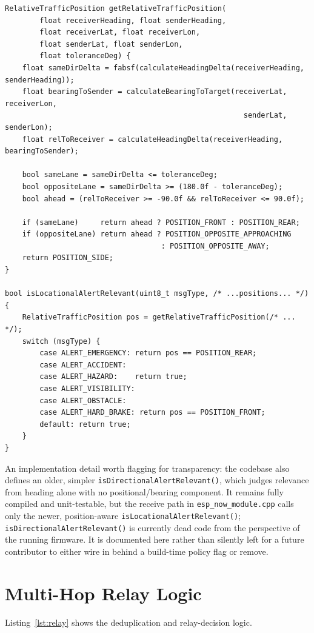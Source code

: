 \documentclass[12pt,a4paper]{report}
\begin{document}
\begin{lstlisting}[caption={Relative-position classification and relevance policy (\texttt{src/directional\_awareness.cpp}, trimmed)}, label={lst:relevance}]
RelativeTrafficPosition getRelativeTrafficPosition(
        float receiverHeading, float senderHeading,
        float receiverLat, float receiverLon,
        float senderLat, float senderLon,
        float toleranceDeg) {
    float sameDirDelta = fabsf(calculateHeadingDelta(receiverHeading, senderHeading));
    float bearingToSender = calculateBearingToTarget(receiverLat, receiverLon,
                                                       senderLat, senderLon);
    float relToReceiver = calculateHeadingDelta(receiverHeading, bearingToSender);

    bool sameLane = sameDirDelta <= toleranceDeg;
    bool oppositeLane = sameDirDelta >= (180.0f - toleranceDeg);
    bool ahead = (relToReceiver >= -90.0f && relToReceiver <= 90.0f);

    if (sameLane)     return ahead ? POSITION_FRONT : POSITION_REAR;
    if (oppositeLane) return ahead ? POSITION_OPPOSITE_APPROACHING
                                    : POSITION_OPPOSITE_AWAY;
    return POSITION_SIDE;
}

bool isLocationalAlertRelevant(uint8_t msgType, /* ...positions... */) {
    RelativeTrafficPosition pos = getRelativeTrafficPosition(/* ... */);
    switch (msgType) {
        case ALERT_EMERGENCY: return pos == POSITION_REAR;
        case ALERT_ACCIDENT:
        case ALERT_HAZARD:    return true;
        case ALERT_VISIBILITY:
        case ALERT_OBSTACLE:
        case ALERT_HARD_BRAKE: return pos == POSITION_FRONT;
        default: return true;
    }
}
\end{lstlisting}

An implementation detail worth flagging for transparency: the codebase also defines an older, simpler \texttt{isDirectionalAlertRelevant()}, which judges relevance from heading alone with no positional/bearing component. It remains fully compiled and unit-testable, but the receive path in \texttt{esp\_now\_module.cpp} calls only the newer, position-aware \texttt{isLocationalAlertRelevant()}; \texttt{isDirectionalAlertRelevant()} is currently dead code from the perspective of the running firmware. It is documented here rather than silently left for a future contributor to either wire in behind a build-time policy flag or remove.

\section{Multi-Hop Relay Logic}
Listing~\ref{lst:relay} shows the deduplication and relay-decision logic.
\end{document}
